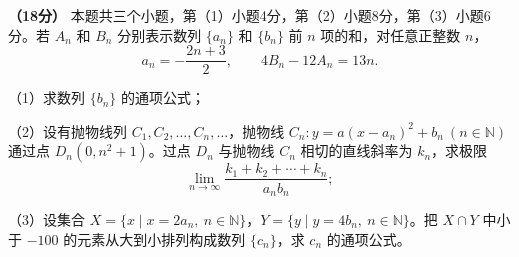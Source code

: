 \begin{question}
\textbf{（18分）} 本题共三个小题，第（1）小题4分，第（2）小题8分，第（3）小题6分。若 $A_n$ 和 $B_n$ 分别表示数列 $\{a_n\}$ 和 $\{b_n\}$ 前 $n$ 项的和，对任意正整数 $n$，
\nopagebreak[4]
\[
a_n=-\frac{2n+3}{2},\qquad 4B_n-12A_n=13n.
\]

（1）求数列 $\{b_n\}$ 的通项公式；

（2）设有抛物线列 $C_1,C_2,\ldots,C_n,\ldots$，抛物线 $C_n:y=a(x-a_n)^2+b_n\ (n\in\mathbb N)$ 通过点 $D_n(0,n^2+1)$。过点 $D_n$ 与抛物线 $C_n$ 相切的直线斜率为 $k_n$，求极限
\nopagebreak[4]
\[
\lim_{n\to\infty}\frac{k_1+k_2+\cdots+k_n}{a_nb_n};
\]

（3）设集合 $X=\{x\mid x=2a_n,\ n\in\mathbb N\}$，$Y=\{y\mid y=4b_n,\ n\in\mathbb N\}$。把 $X\cap Y$ 中小于 $-100$ 的元素从大到小排列构成数列 $\{c_n\}$，求 $c_n$ 的通项公式。

\end{question}